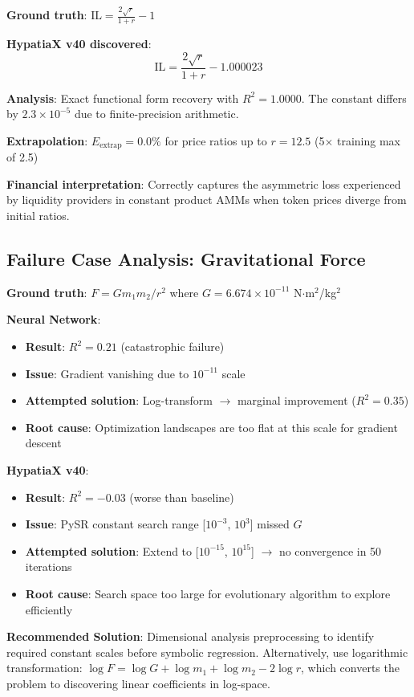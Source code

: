 \documentclass[twoside,11pt]{article}
\begin{document}
\begin{example}
\textbf{Ground truth}: $\text{IL} = \frac{2\sqrt{r}}{1+r} - 1$

\textbf{HypatiaX v40 discovered}:
\begin{equation}
\text{IL} = \frac{2\sqrt{r}}{1+r} - 1.000023
\end{equation}

\textbf{Analysis}: Exact functional form recovery with $R^2 = 1.0000$. The constant differs by $2.3 \times 10^{-5}$ due to finite-precision arithmetic.

\textbf{Extrapolation}: $E_{\text{extrap}} = 0.0\%$ for price ratios up to $r = 12.5$ (5$\times$ training max of 2.5)

\textbf{Financial interpretation}: Correctly captures the asymmetric loss experienced by liquidity providers in constant product AMMs when token prices diverge from initial ratios.
\end{example}

\subsection{Failure Case Analysis: Gravitational Force}

\begin{example}
\textbf{Ground truth}: $F = Gm_1m_2/r^2$ where $G = 6.674 \times 10^{-11}$ N$\cdot$m$^2$/kg$^2$

\textbf{Neural Network}:
\begin{itemize}
\item \textbf{Result}: $R^2 = 0.21$ (catastrophic failure)
\item \textbf{Issue}: Gradient vanishing due to $10^{-11}$ scale
\item \textbf{Attempted solution}: Log-transform $\to$ marginal improvement ($R^2 = 0.35$)
\item \textbf{Root cause}: Optimization landscapes are too flat at this scale for gradient descent
\end{itemize}

\textbf{HypatiaX v40}:
\begin{itemize}
\item \textbf{Result}: $R^2 = -0.03$ (worse than baseline)
\item \textbf{Issue}: PySR constant search range [$10^{-3}$, $10^3$] missed $G$
\item \textbf{Attempted solution}: Extend to [$10^{-15}$, $10^{15}$] $\to$ no convergence in 50 iterations
\item \textbf{Root cause}: Search space too large for evolutionary algorithm to explore efficiently
\end{itemize}

\textbf{Recommended Solution}: Dimensional analysis preprocessing to identify required constant scales before symbolic regression. Alternatively, use logarithmic transformation: $\log F = \log G + \log m_1 + \log m_2 - 2\log r$, which converts the problem to discovering linear coefficients in log-space.
\end{example}
\end{document}

